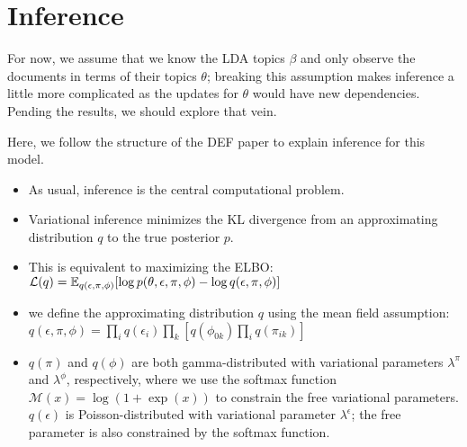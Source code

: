 \section{Inference}
For now, we assume that we know the LDA topics $\beta$ and only observe the documents in terms of their topics $\theta$; breaking this assumption makes inference a little more complicated as the updates for $\theta$ would have new dependencies.  Pending the results, we should explore that vein. 

Here, we follow the structure of the DEF paper to explain inference for this model.

\begin{itemize}
\item As usual, inference is the central computational problem.
\item Variational inference minimizes the KL divergence from an approximating distribution $q$ to the true posterior $p$.
\item This is equivalent to maximizing the ELBO: $\mathcal{L}(q)  = \mathbb{E}_{q(\epsilon, \pi, \phi)}[\log p(\theta,\epsilon,\pi,\phi) - \log q(\epsilon, \pi, \phi)]$
\item we define the approximating distribution $q$ using the mean field assumption: $q(\epsilon, \pi, \phi) = \prod_i q(\epsilon_{i})\prod_k\left[q(\phi_{0k})\prod_i q(\pi_{ik})\right]$ 
\item $q(\pi)$ and $q(\phi)$ are both gamma-distributed with variational parameters $\lambda^\pi$ and $\lambda^\phi$, respectively, where we use the softmax function $\mathcal{M}(x) = \log(1+\exp(x))$ to constrain the free variational parameters.
$q(\epsilon)$ is Poisson-distributed with variational parameter $\lambda^\epsilon$; the free parameter is also constrained by the softmax function.


\end{itemize}
